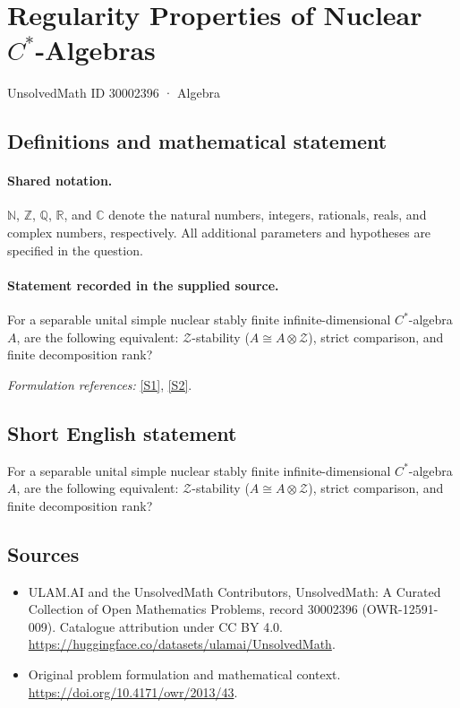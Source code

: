 \documentclass[11pt]{article}
\newcommand{\sref}[2]{\hyperlink{source:#1:#2}{[S#2]}}
\begin{document}
\setcounter{section}{30002395}
\section{\texorpdfstring{Regularity Properties of Nuclear $C^*$-Algebras}{Regularity Properties of Nuclear C\textasciicircum{}*-Algebras}}\label{30002396}
{\small UnsolvedMath ID 30002396 · Algebra}
\subsection{Definitions and mathematical statement}

\paragraph{Shared notation.}$\mathbb N$, $\mathbb Z$, $\mathbb Q$, $\mathbb R$, and $\mathbb C$ denote the natural numbers, integers, rationals, reals, and complex numbers, respectively. All additional parameters and hypotheses are specified in the question.


\paragraph{Statement recorded in the supplied source.}
For a separable unital simple nuclear stably finite infinite-dimensional $C^*$-algebra $A$, are the following equivalent: $\mathcal Z$-stability ($A\cong A\otimes\mathcal Z$), strict comparison, and finite decomposition rank?
\par\smallskip\textit{Formulation references:} \sref{30002396}{1}, \sref{30002396}{2}.
\subsection{Short English statement}
For a separable unital simple nuclear stably finite infinite-dimensional $C^*$-algebra $A$, are the following equivalent: $\mathcal Z$-stability ($A\cong A\otimes\mathcal Z$), strict comparison, and finite decomposition rank?
\subsection{Sources}
\begin{itemize}
\item[\hypertarget{source:30002396:1}{S1}] ULAM.AI and the UnsolvedMath Contributors, UnsolvedMath: A Curated Collection of Open Mathematics Problems, record 30002396 (OWR-12591-009). Catalogue attribution under CC BY 4.0.
\url{https://huggingface.co/datasets/ulamai/UnsolvedMath}.
\item[\hypertarget{source:30002396:2}{S2}] Original problem formulation and mathematical context.
\url{https://doi.org/10.4171/owr/2013/43}.
\end{itemize}
\label{end:30002396}
\end{document}

